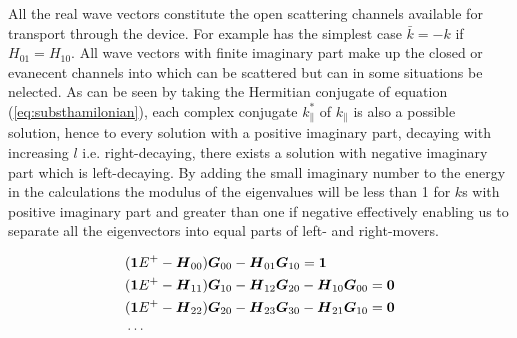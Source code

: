 All the real wave vectors constitute the open scattering channels available for transport through the device. For example has the simplest case
$\bar{k}=-k$ if $H_{01}=H_{10}$.
All wave vectors with finite imaginary part make up the closed or evanecent channels into which can be scattered but can in some situations be nelected.
As can be seen by taking the Hermitian conjugate of equation (\ref{eq:substhamilonian}), each complex conjugate $k_{\|}^*$ of $k_{\|}$ is also a possible solution, 
hence to every solution with a positive imaginary part, decaying with increasing $l$ i.e. right-decaying, there exists a solution with negative imaginary part which is left-decaying.
By adding the small imaginary number to the energy in the calculations the modulus of the eigenvalues will be less than 1 for $k$s with positive imaginary part and greater than one if negative effectively enabling us to separate all the eigenvectors into equal parts of left- and right-movers\cite{JChemPhys.120.7733}.

\begin{align}
	&(\boldsymbol{1}E^+-\boldsymbol{H}_{00})\boldsymbol{G}_{00}-\boldsymbol{H}_{01}\boldsymbol{G}_{10}=\boldsymbol{1}\nonumber \\
	&(\boldsymbol{1}E^+-\boldsymbol{H}_{11})\boldsymbol{G}_{10}-\boldsymbol{H}_{12}\boldsymbol{G}_{20}-\boldsymbol{H}_{10}\boldsymbol{G}_{00}=\boldsymbol{0}\\
	&(\boldsymbol{1}E^+-\boldsymbol{H}_{22})\boldsymbol{G}_{20}-\boldsymbol{H}_{23}\boldsymbol{G}_{30}-\boldsymbol{H}_{21}\boldsymbol{G}_{10}=\boldsymbol{0}\nonumber \\
	&\cdots\nonumber
	\label{eq:LRS}
\end{align}
\clearpage



